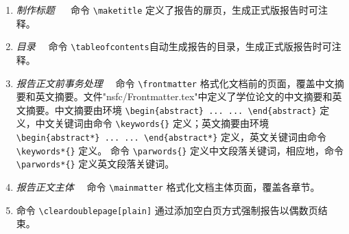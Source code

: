 \begin{enumerate}
\item \emph{制作标题} ~~ 命令 \verb|\maketitle| 定义了报告的扉页，生成正式版报告时可注释。
\item \emph{目录}~~ 命令 \verb|\tableofcontents|自动生成报告的目录，生成正式版报告时可注释。
\item \emph{报告正文前事务处理}~~ 命令 \verb|\frontmatter| 格式化文档前的页面，覆盖中文摘要和英文摘要。文件"nsfc/Frontmatter.tex"中定义了学位论文的中文摘要和英文摘要。中文摘要由环境 \verb|\begin{abstract} ... ... \end{abstract}| 定义，中文关键词由命令 \verb|\keywords{}| 定义；英文摘要由环境 \verb|\begin{abstract*} ... ... \end{abstract*}| 定义，英文关键词由命令 \verb|\keywords*{}| 定义。 命令 \verb|\parwords{}| 定义中文段落关键词，相应地，命令 \verb|\parwords*{}| 定义英文段落关键词。
\item \emph{报告正文主体}~~ 命令 \verb|\mainmatter| 格式化文档主体页面，覆盖各章节。
\item 命令 \verb|\cleardoublepage[plain]| 通过添加空白页方式强制报告以偶数页结束。
\end{enumerate}
